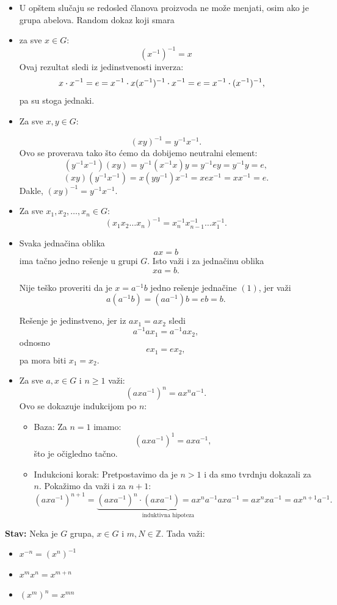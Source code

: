\documentclass[a4paper,12pt]{article}
\begin{document}
\begin{itemize}
\begin{itemize}
  Ako bi svi \( x_i \) bili jednaki nekom elementu \( x \in G \), onda bi za sve 
  \( m, n \in \mathbb{N} \) važilo \(x^m x^n = x^{m+n}\).
\end{itemize}
\item U opštem slučaju se redosled članova proizvoda ne može menjati, osim ako je grupa abelova.
Random dokaz koji smara
\item za sve \( x \in G \):
  \[ (x^{-1})^{-1} = x \]
  Ovaj rezultat sledi iz jedinstvenosti inverza:
  \[
    \begin{aligned}
      x \cdot x^{-1} &= e = x^{-1} \cdot x
      \hfill
      (x^{-1})^{-1} \cdot x^{-1} = e = x^{-1} \cdot (x^{-1})^{-1},
    \end{aligned}
  \]
pa su stoga jednaki.
\item Za sve \( x, y \in G \):

\[
    (xy)^{-1} = y^{-1} x^{-1}.
\]
Ovo se proverava tako što ćemo da dobijemo neutralni element:
\[
  (y^{-1}x^{-1})(xy) = y^{-1}(x^{-1}x)y = y^{-1} e y = y^{-1} y = e,
\]
\[
  (xy)(y^{-1}x^{-1}) = x(yy^{-1})x^{-1} = x e x^{-1} = x x^{-1} = e.
\]
Dakle, \( (xy)^{-1} = y^{-1} x^{-1} \).

\item Za sve \( x_1, x_2, \dots, x_n \in G \):
\[
  (x_1 x_2 \dots x_n)^{-1} = x_n^{-1} x_{n-1}^{-1} \dots x_1^{-1}.
\]

\item Svaka jednačina oblika
\[
ax = b \tag{1}
\]
ima tačno jedno rešenje u grupi \(G\). Isto važi i za jednačinu oblika
\[
xa = b.
\]

Nije teško proveriti da je \(x = a^{-1}b\) jedno rešenje jednačine \((1)\), jer važi
\[
a(a^{-1}b) = (aa^{-1})b = eb = b.
\]

Rešenje je jedinstveno, jer iz \(ax_1 = ax_2\) sledi
\[
a^{-1}ax_1 = a^{-1}ax_2,
\]
odnosno
\[
ex_1 = ex_2,
\]
pa mora biti \(x_1 = x_2\).
\item Za sve \( a, x \in G \) i \( n \geq 1 \) važi:
\[
  (a x a^{-1})^n = a x^n a^{-1}.
\]
Ovo se dokazuje indukcijom po \( n \):
\begin{itemize}
  \item Baza: Za \( n = 1 \) imamo:
  \[
    (a x a^{-1})^1 = a x a^{-1},
  \]
  što je očigledno tačno.
  \item Indukcioni korak: Pretpostavimo da je \( n > 1 \) i da smo tvrdnju dokazali za  \( n \).
  Pokažimo da važi i za \( n +1 \):
  \[
    (a x a^{-1})^{n+1} = \underbrace{(a x a^{-1})^n \cdot (a x a^{-1}) = ax^na^{-1}axa^{-1}}_{\text{induktivna hipoteza}} = ax^nxa^{-1} = ax^{n+1} a^{-1}.
  \]
  \end{itemize}
\end{itemize}
\bigskip
\textbf{Stav:} Neka je \( G \) grupa, \( x \in G \) i \( m, N \in \mathbb{Z} \). Tada važi:
  \begin{itemize}
  \item \( x^{-n} = (x^n)^{-1} \)
  \item \( x^m x^n = x^{m+n} \)
  \item \( (x^m)^n = x^{mn} \)
  \end{itemize}
\end{document}
